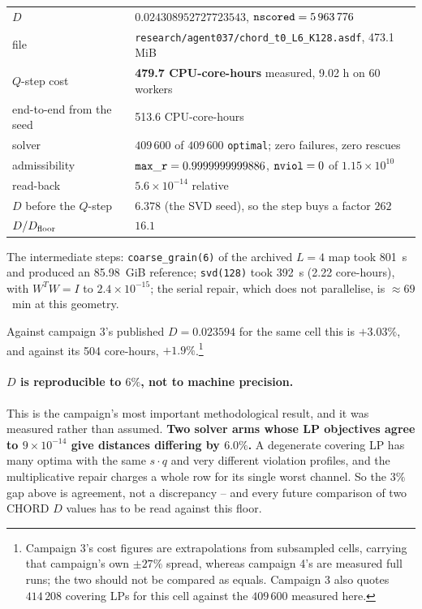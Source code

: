 \documentclass{article}
\numberwithin{equation}{section}   %
\begin{document}
\begin{center}
\small
\begin{tabular}{ll}
\toprule
$D$                         & $\mathbf{0.024308952727723543}$, ${\tt nscored} = 5\,963\,776$ \\
file                        & {\tt research/agent037/chord\_t0\_L6\_K128.asdf}, 473.1 MiB \\
$Q$-step cost               & {\bf 479.7 CPU-core-hours} measured, 9.02 h on 60 workers \\
end-to-end from the seed    & 513.6 CPU-core-hours \\
solver                      & $409\,600$ of $409\,600$ {\tt optimal}; zero failures, zero rescues \\
admissibility               & ${\tt max\_r} = 0.9999999999886$, ${\tt nviol} = 0$ of $1.15\times 10^{10}$ \\
read-back                   & $5.6\times10^{-14}$ relative \\
\midrule
$D$ before the $Q$-step     & $6.378$ (the SVD seed), so the step buys a factor $262$ \\
$D/D_{\rm floor}$           & $16.1$ \\
\bottomrule
\end{tabular}
\end{center}

\par\noindent
The intermediate steps: {\tt coarse\_grain(6)} of the archived $L=4$ map took 801~s and
produced an 85.98~GiB reference; {\tt svd(128)} took 392~s (2.22 core-hours), with
$W^TW = I$ to $2.4\times10^{-15}$; the serial repair, which does not parallelise, is
$\approx 69$~min at this geometry.

Against campaign 3's published $D = 0.023594$ for the same cell this is $+3.03\%$, and against
its 504 core-hours, $+1.9\%$.\footnote{Campaign 3's cost figures are extrapolations from
subsampled cells, carrying that campaign's own $\pm 27\%$ spread, whereas campaign 4's are
measured full runs; the two should not be compared as equals. Campaign 3 also quotes
$414\,208$ covering LPs for this cell against the $409\,600$ measured here.}

\paragraph{$D$ is reproducible to $6\%$, not to machine precision.}
This is the campaign's most important methodological result, and it was measured rather than
assumed. {\bf Two solver arms whose LP objectives agree to $9\times10^{-14}$ give distances
differing by $6.0\%$.} A degenerate covering LP has many optima with the same $s \cdot q$ and
very different violation profiles, and the multiplicative repair charges a whole row for its
single worst channel. So the $3\%$ gap above is agreement, not a discrepancy -- and every
future comparison of two CHORD $D$ values has to be read against this floor.
\end{document}
